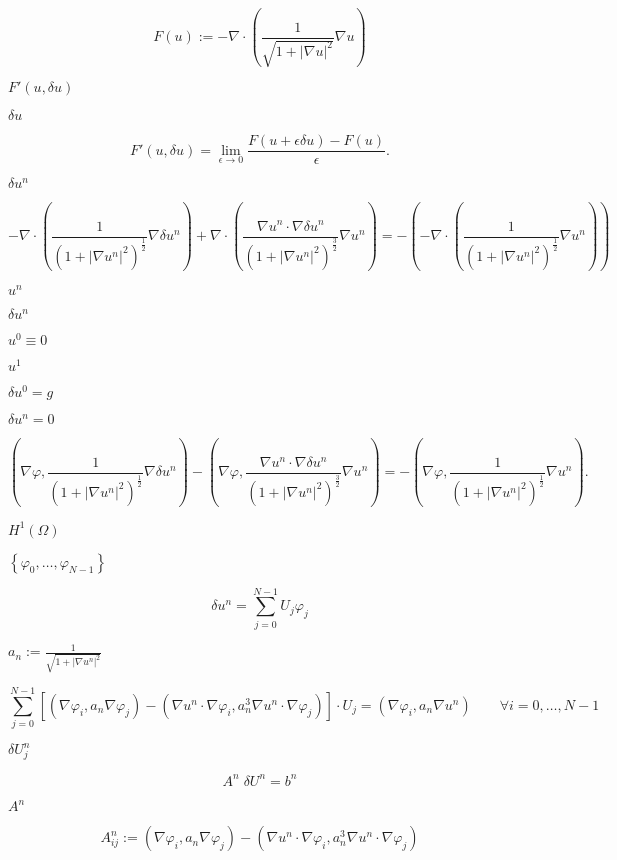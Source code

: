\documentclass{article}
\begin{document}
\[ F(u):= -\nabla \cdot \left( \frac{1}{\sqrt{1+|\nabla u|^{2}}}\nabla u \right) \]
\pagebreak

$F'(u,\delta u)$
\pagebreak

$\delta u$
\pagebreak

\[ F'(u,\delta u)=\lim \limits_{\epsilon \rightarrow 0}{\frac{F(u+\epsilon \delta u)- F(u)}{\epsilon}}. \]
\pagebreak

$\delta u^n$
\pagebreak

\[ - \nabla \cdot \left( \frac{1}{(1+|\nabla u^{n}|^{2})^{\frac{1}{2}}}\nabla \delta u^{n} \right) + \nabla \cdot \left( \frac{\nabla u^{n} \cdot \nabla \delta u^{n}}{(1+|\nabla u^{n}|^{2})^{\frac{3}{2}}} \nabla u^{n} \right) = -\left( - \nabla \cdot \left( \frac{1}{(1+|\nabla u^{n}|^{2})^{\frac{1}{2}}} \nabla u^{n} \right) \right) \]
\pagebreak

$u^{n}$
\pagebreak

$\delta u^{n}$
\pagebreak

$u^{0}\equiv 0$
\pagebreak

$u^{1}$
\pagebreak

$\delta u^{0}=g$
\pagebreak

$\delta u^{n}=0$
\pagebreak

\[ \left( \nabla \varphi , \frac{1}{(1+|\nabla u^{n}|^{2})^{\frac{1}{2}}}\nabla \delta u^{n} \right)-\left(\nabla \varphi ,\frac{\nabla u^{n} \cdot \nabla \delta u^{n}}{(1+|\nabla u^{n}|^{2})^{\frac{3}{2}}}\nabla u^{n} \right) = -\left(\nabla \varphi , \frac{1}{(1+|\nabla u^{n}|^{2})^{\frac{1}{2}}} \nabla u^{n} \right). \]
\pagebreak

$H^{1}(\Omega)$
\pagebreak

$\left\{ \varphi_{0},\dots , \varphi_{N-1}\right\}$
\pagebreak

\[ \delta u^{n}=\sum_{j=0}^{N-1} U_{j} \varphi_{j} \]
\pagebreak

$a_{n}:=\frac{1} {\sqrt{1+|\nabla u^{n}|^{2}}}$
\pagebreak

\[ \sum_{j=0}^{N-1}\left[ \left( \nabla \varphi_{i} , a_{n} \nabla \varphi_{j} \right) - \left(\nabla u^{n}\cdot \nabla \varphi_{i} , a_{n}^{3} \nabla u^{n} \cdot \nabla \varphi_{j} \right) \right] \cdot U_{j}=\left( \nabla \varphi_{i} , a_{n} \nabla u^{n}\right) \qquad \forall i=0,\dots ,N-1 \]
\pagebreak

$\delta U^{n}_{j}$
\pagebreak

\[ A^{n}\; \delta U^{n}=b^{n} \]
\pagebreak

$A^{n}$
\pagebreak

\[ A^{n}_{ij}:= \left( \nabla \varphi_{i} , a_{n} \nabla \varphi_{j} \right) - \left(\nabla u^{n}\cdot \nabla \varphi_{i} , a_{n}^{3} \nabla u^{n} \cdot \nabla \varphi_{j} \right) \]
\pagebreak
\end{document}
